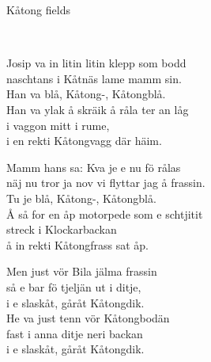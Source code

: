 \begin{song}{Kåtong fields}
	
	
	\\
	
	Josip va in litin litin klepp som bodd\\
	naschtans i Kåtnäs lame mamm sin.\\
	Han va blå, Kåtong-, Kåtongblå.\\
	Han va ylak å skräik å råla ter an låg\\
	i vaggon mitt i rume,\\
	i en rekti Kåtongvagg där häim.
	
	Mamm hans sa: Kva je e nu fö rålas\\
	näj nu tror ja nov vi flyttar jag å frassin.\\
	Tu je blå, Kåtong-, Kåtongblå.\\
	Å så for en åp motorpede som e schtjitit\\
	streck i Klockarbackan\\
	å in rekti Kåtongfrass sat åp.
	
	Men just vör Bila jälma frassin\\
	så e bar fö tjeljän ut i ditje,\\
	i e slaskåt, gåråt Kåtongdik.\\
	He va just tenn vör Kåtongbodän\\
	fast i anna ditje neri backan\\
	i e slaskåt, gåråt Kåtongdik.
	
\end{song}
